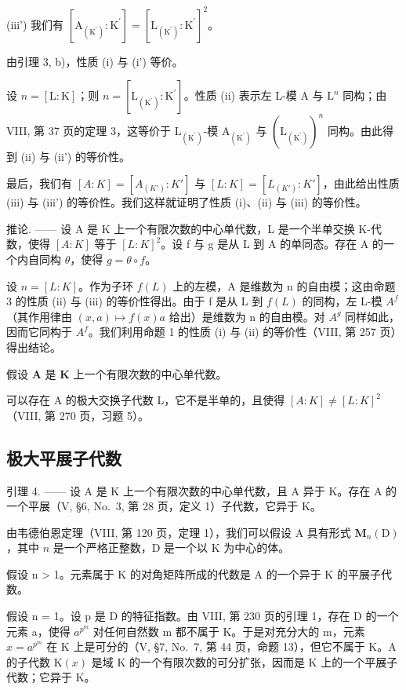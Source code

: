 (iii') 我们有 \(\left[\mathrm{A}_{\left(\mathrm{K}^{\prime}\right)}:\mathrm{K}^{\prime}\right] = \left[\mathrm{L}_{\left(\mathrm{K}^{\prime}\right)}:\mathrm{K}^{\prime}\right]^{2}\)。

由引理 3, b)，性质 (i) 与 (i') 等价。

设 \(n = [\mathrm{L}:\mathrm{K}]\)；则 \(n = [\mathrm{L}_{(\mathrm{K}^{\prime})}:\mathrm{K}^{\prime}]\)。性质 (ii) 表示左 L-模 A 与 \(\mathrm{L}^n\) 同构；由 VIII, 第 37 页的定理 3，这等价于 \(\mathrm{L}_{(\mathrm{K}^{\prime})}\)-模 \(\mathrm{A}_{(\mathrm{K}^{\prime})}\) 与 \((\mathrm{L}_{(\mathrm{K}^{\prime})})^n\) 同构。由此得到 (ii) 与 (ii') 的等价性。

最后，我们有 \([A:K]=[A_{(K')}:K']\) 与 \([L:K]=[L_{(K')}:K']\)，由此给出性质 (iii) 与 (iii') 的等价性。我们这样就证明了性质 (i)、(ii) 与 (iii) 的等价性。

推论. —— 设 A 是 K 上一个有限次数的中心单代数，L 是一个半单交换 K-代数，使得 \([A:K]\) 等于 \([L:K]^{2}\)。设 f 与 g 是从 L 到 A 的单同态。存在 A 的一个内自同构 \(\theta\)，使得 \(g = \theta \circ f\)。

设 \(n = [L : K]\)。作为子环 \(f(L)\) 上的左模，A 是维数为 n 的自由模；这由命题 3 的性质 (ii) 与 (iii) 的等价性得出。由于 f 是从 L 到 \(f(L)\) 的同构，左 L-模 \(A^{f}\)（其作用律由 \((x, a) \mapsto f(x)a\) 给出）是维数为 n 的自由模。对 \(A^{g}\) 同样如此，因而它同构于 \(A^{f}\)。我们利用命题 1 的性质 (i) 与 (ii) 的等价性（VIII, 第 257 页）得出结论。

假设 \(\mathbf{A}\) 是 \(\mathbf{K}\) 上一个有限次数的中心单代数。

可以存在 A 的极大交换子代数 L，它不是半单的，且使得 \([A:K]\neq[L:K]^{2}\)（VIII, 第 270 页，习题 5）。

\subsection{极大平展子代数}

引理 4. —— 设 A 是 K 上一个有限次数的中心单代数，且 A 异于 K。存在 A 的一个平展（V, §6, No.~3, 第 28 页，定义 1）子代数，它异于 K。

由韦德伯恩定理（VIII, 第 120 页，定理 1），我们可以假设 \(\mathrm{A}\) 具有形式 \(\mathbf{M}_n(\mathrm{D})\)，其中 \(n\) 是一个严格正整数，\(\mathrm{D}\) 是一个以 \(\mathrm{K}\) 为中心的体。

假设 n \textgreater{} 1。元素属于 K 的对角矩阵所成的代数是 A 的一个异于 K 的平展子代数。

假设 n = 1。设 p 是 D 的特征指数。由 VIII, 第 230 页的引理 1，存在 D 的一个元素 a，使得 \(a^{p^{m}}\) 对任何自然数 m 都不属于 K。于是对充分大的 m，元素 \(x = a^{p^{m}}\) 在 K 上是可分的（V, §7, No.~7, 第 44 页，命题 13），但它不属于 K。A 的子代数 \(\mathrm{K}(x)\) 是域 K 的一个有限次数的可分扩张，因而是 K 上的一个平展子代数；它异于 K。

